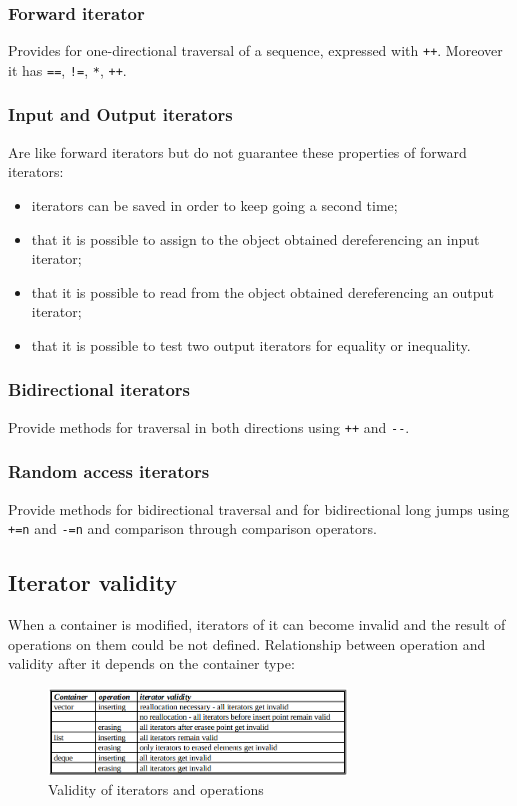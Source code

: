 \subsubsection{Forward iterator}
Provides for one-directional traversal of a sequence, expressed with \verb|++|.
Moreover it has \verb|==|, \verb|!=|, \verb|*|, \verb|++|.

\subsubsection{Input and Output iterators}
Are like forward iterators but do not guarantee these properties of forward iterators:
\begin{itemize}
    \item iterators can be saved in order to keep going a second time;
    \item that it is possible to assign to the object obtained dereferencing an input iterator;
    \item that it is possible to read from the object obtained dereferencing an output iterator;
    \item that it is possible to test two output iterators for equality or inequality.
\end{itemize}

\subsubsection{Bidirectional iterators}
Provide methods for traversal in both directions using \verb|++| and \verb|--|.

\subsubsection{Random access iterators}
Provide methods for bidirectional traversal and for bidirectional long jumps using \verb|+=n| and \verb|-=n| and comparison through comparison operators.

\subsection{Iterator validity}
When a container is modified, iterators of it can become invalid and the result of operations on them could be not defined.
Relationship between operation and validity after it depends on the container type:
\begin{figure}[H]
    \centering
    \includegraphics[width=300px]{images/6_STL/validity.png}
    \caption{Validity of iterators and operations}
\end{figure}

